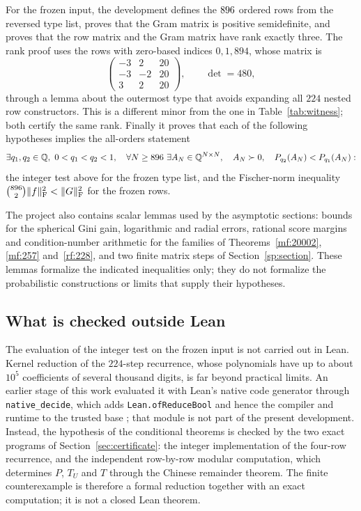 For the frozen input, the development defines the $896$ ordered rows
from the reversed type list, proves that the Gram matrix is positive
semidefinite, and proves that the row matrix and the Gram matrix have
rank exactly three. The rank proof uses the rows with zero-based indices
$0,1,894$, whose matrix is
\[
 \begin{pmatrix}-3&2&20\\-3&-2&20\\3&2&20\end{pmatrix},
 \qquad \det=480,
\]
through a lemma about the outermost type that avoids expanding all
$224$ nested row constructors. This is a different minor from the one
in Table~\ref{tab:witness}; both certify the same rank. Finally it
proves that each of the following hypotheses implies the all-orders
statement
\[
 \exists q_1,q_2\in\mathbb Q,\ 0<q_1<q_2<1,\quad
 \forall N\ge896\ \exists A_N\in\mathbb Q^{N\times N},\quad
 A_N\succ0,\quad P_{q_2}(A_N)<P_{q_1}(A_N):
\]
the integer test above for the frozen type list, and the Fischer-norm
inequality $\binom{896}2\|f\|_{\mathrm F}^2<\|G\|_{\mathrm F}^2$ for the frozen rows.

The project also contains scalar lemmas used by the asymptotic
sections: bounds for the spherical Gini gain, logarithmic and radial
errors, rational score margins and condition-number arithmetic for the
families of Theorems~\ref{mf:20002}, \ref{mf:257} and~\ref{rf:228}, and
two finite matrix steps of Section~\ref{sp:section}. These lemmas
formalize the indicated inequalities only; they do not formalize the
probabilistic constructions or limits that supply their hypotheses.

\subsection{What is checked outside Lean}

The evaluation of the integer test on the frozen input is not carried
out in Lean. Kernel reduction of the $224$-step recurrence, whose
polynomials have up to about $10^5$ coefficients of several thousand
digits, is far beyond practical limits. An earlier stage of this work
evaluated it with Lean's native code generator through
\texttt{native\_decide}, which adds \texttt{Lean.ofReduceBool} and hence
the compiler and runtime to the trusted base \cite{LeanNativeDocumentation};
that module is not part of the present development. Instead, the
hypothesis of the conditional theorems is checked by the two exact
programs of Section~\ref{sec:certificate}: the integer implementation of
the four-row recurrence, and the independent row-by-row modular
computation, which determines $P$, $T_U$ and $T$ through the Chinese
remainder theorem. The finite counterexample is therefore a formal
reduction together with an exact computation; it is not a closed
Lean theorem.

